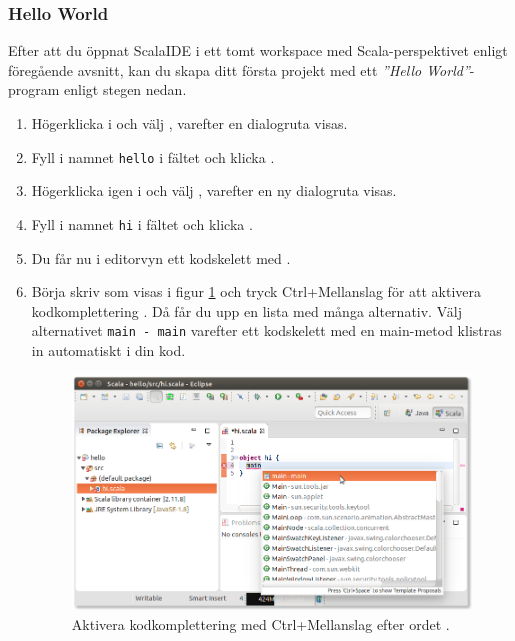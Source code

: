 \subsubsection{Hello World}\label{subsubsection:eclipse:hello-world}

Efter att du öppnat ScalaIDE i ett tomt workspace med Scala-perspektivet enligt föregående avsnitt, kan du skapa ditt första projekt med ett \textit{''Hello World''}-program enligt stegen nedan.

\begin{enumerate}
\item Högerklicka i  och välj , varefter en dialogruta visas.

\item Fyll i namnet \texttt{hello} i fältet  och klicka .

\item Högerklicka igen i  och välj , varefter en ny dialogruta visas.

\item Fyll i namnet \texttt{hi} i fältet  och klicka .

\item Du får nu i editorvyn ett kodskelett med .

\item Börja skriv  som visas i figur \ref{fig:appendix:eclipse:complete-main} och tryck Ctrl+Mellanslag för att aktivera kodkomplettering . Då får du upp en lista med många alternativ. Välj alternativet \texttt{main - main} varefter ett kodskelett med en main-metod klistras in automatiskt i din kod.

\begin{figure}
\centering
\includegraphics[width=1.0\textwidth]{../img/eclipse/eclipse-complete-main.png}
\caption{Aktivera kodkomplettering med Ctrl+Mellanslag efter ordet .}
\label{fig:appendix:eclipse:complete-main}
\end{figure}


\end{enumerate}
